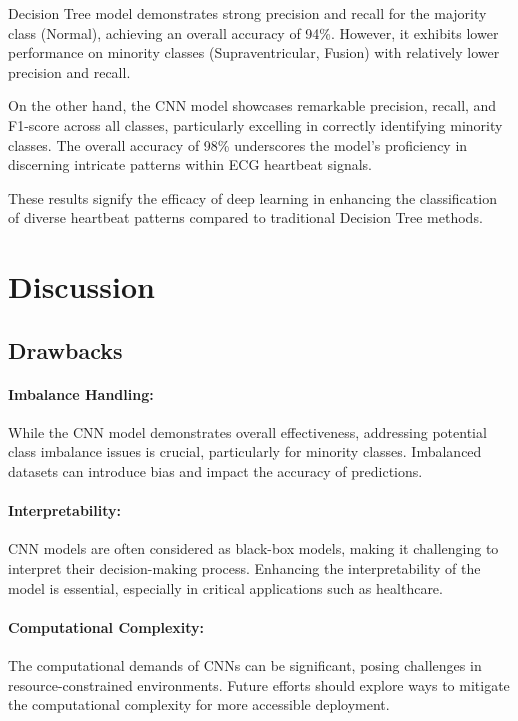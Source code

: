 \documentclass[]{acmsiggraph}
\begin{document}
Decision Tree model demonstrates strong precision and recall for the majority class (Normal), achieving an overall accuracy of 94\%. However, it exhibits lower performance on minority classes (Supraventricular, Fusion) with relatively lower precision and recall.

On the other hand, the CNN model showcases remarkable precision, recall, and F1-score across all classes, particularly excelling in correctly identifying minority classes. The overall accuracy of 98\% underscores the model's proficiency in discerning intricate patterns within ECG heartbeat signals. 

These results signify the efficacy of deep learning in enhancing the classification of diverse heartbeat patterns compared to traditional Decision Tree methods.

\section{Discussion}

\subsection{Drawbacks}

\paragraph{Imbalance Handling:}While the CNN model demonstrates overall effectiveness, addressing potential class imbalance issues is crucial, particularly for minority classes. Imbalanced datasets can introduce bias and impact the accuracy of predictions.

\paragraph{Interpretability:}CNN models are often considered as black-box models, making it challenging to interpret their decision-making process. Enhancing the interpretability of the model is essential, especially in critical applications such as healthcare.

\paragraph{Computational Complexity:}The computational demands of CNNs can be significant, posing challenges in resource-constrained environments. Future efforts should explore ways to mitigate the computational complexity for more accessible deployment.
\end{document}
